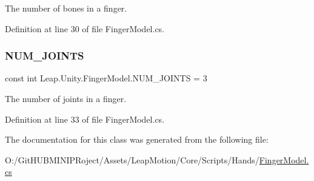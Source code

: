 The number of bones in a finger. 

Definition at line 30 of file Finger\+Model.\+cs.

\mbox{\label{class_leap_1_1_unity_1_1_finger_model_a7c3698c9580cdab983d5273b88c6d288}} 
\subsubsection{\texorpdfstring{NUM\_JOINTS}{NUM\_JOINTS}}
{\footnotesize\ttfamily const int Leap.\+Unity.\+Finger\+Model.\+N\+U\+M\+\_\+\+J\+O\+I\+N\+TS = 3}

The number of joints in a finger. 

Definition at line 33 of file Finger\+Model.\+cs.



The documentation for this class was generated from the following file\+:\begin{DoxyCompactItemize}
\item 
O\+:/\+Git\+H\+U\+B\+M\+I\+N\+I\+P\+Roject/\+Assets/\+Leap\+Motion/\+Core/\+Scripts/\+Hands/\mbox{\hyperlink{_finger_model_8cs}{Finger\+Model.\+cs}}\end{DoxyCompactItemize}
